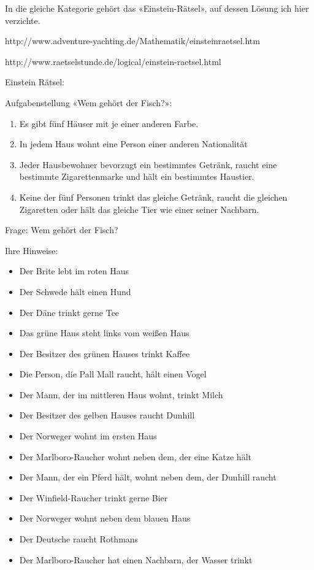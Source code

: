 {\newpage

In die gleiche Kategorie gehört das «Einstein-Rätsel», auf dessen Lösung ich hier
verzichte.

http://www.adventure-yachting.de/Mathematik/einsteinraetsel.htm

http://www.raetselstunde.de/logical/einstein-raetsel.html

Einstein Rätsel:

Aufgabenstellung «Wem gehört der Fisch?»:

\begin{enumerate}
\item
 Es gibt fünf Häuser mit je einer anderen Farbe.
 \item
  In jedem Haus wohnt eine Person einer anderen Nationalität
  \item
   Jeder Hausbewohner bevorzugt ein bestimmtes Getränk,
raucht eine bestimmte Zigarettenmarke und hält ein
bestimmtes Haustier.
\item
 Keine der fünf Personen trinkt das gleiche Getränk, raucht
die gleichen Zigaretten oder hält das gleiche Tier wie einer
seiner Nachbarn.
\end{enumerate}

Frage: Wem gehört der Fisch?

Ihre Hinweise:

\begin{itemize}
\item Der Brite lebt im roten Haus
\item Der Schwede hält einen Hund
\item Der Däne trinkt gerne Tee
\item Das grüne Haus steht links vom weißen Haus
\item Der Besitzer des grünen Hauses trinkt Kaffee
\item Die Person, die Pall Mall raucht, hält einen Vogel
\item Der Mann, der im mittleren Haus wohnt, trinkt Milch
\item Der Besitzer des gelben Hauses raucht Dunhill
\item Der Norweger wohnt im ersten Haus
\item Der Marlboro-Raucher wohnt neben dem, der eine Katze hält
\item Der Mann, der ein Pferd hält, wohnt neben dem, der Dunhill raucht
\item Der Winfield-Raucher trinkt gerne Bier
\item Der Norweger wohnt neben dem blauen Haus
\item Der Deutsche raucht Rothmans
\item Der Marlboro-Raucher hat einen Nachbarn, der Wasser trinkt
\end{itemize}

\newpage
}%



